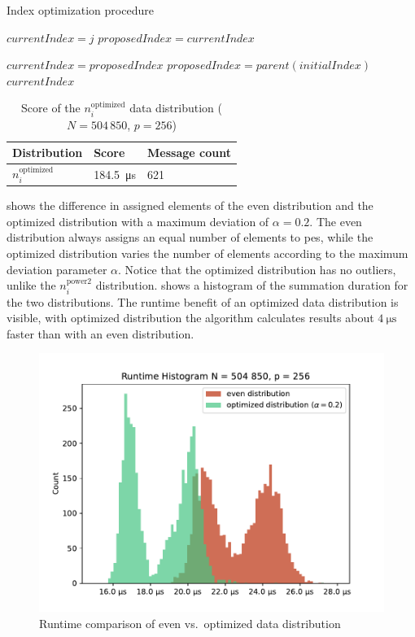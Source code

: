 \begin{algorithm}
\caption{Index optimization procedure}\label{algo:optimizeIndex}
\DontPrintSemicolon
\SetAlgoLined
{}

$currentIndex = j$\;
$proposedIndex = currentIndex$\;

 {
	$currentIndex = proposedIndex$\;
	$proposedIndex = parent(initialIndex)$\;
}
\Return $currentIndex$\;
\end{algorithm}


\begin{table}
\centering
\begin{tabular}{l|l|l}
Distribution & Score & Message count \\
\hline
$n_i^\textrm{optimized}$ & \SI{184.5}{\micro\second} & 621
\end{tabular}
\caption{Score of the $n_i^\textrm{optimized}$ data distribution ($N = 504\,850$, $p=256$)}
\label{table:Power2DistributionScore}
\end{table}

 shows the difference in assigned elements of the even distribution and the optimized distribution with a maximum deviation of $\alpha = 0.2$.
The even distribution always assigns an equal number of elements to \glspl{pe}, while the optimized distribution varies the number of elements according to the maximum deviation parameter $\alpha$.
Notice that the optimized distribution has no outliers, unlike the $n_i^\textrm{power2}$ distribution.
 shows a histogram of the summation duration for the two distributions.
The runtime benefit of an optimized data distribution is visible, with optimized distribution the algorithm calculates results about $\SI{4}{\micro\second}$ faster than with  an even distribution.

\begin{figure}
\centering
\includegraphics[scale=0.75]{figures/distribution_experiment}
\caption{Runtime comparison of even vs.\ optimized data distribution}
\label{fig:distribution_runtimes}
\end{figure}

